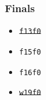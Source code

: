 \begin{minipage}[t]{\width\textwidth}
    \subsubsection*{Finals}
    \begin{itemize}
        \item \st{\texttt{f13f0}}
        \item \texttt{f15f0}
        \item \texttt{f16f0}
        \item \st{\texttt{w19f0}}
    \end{itemize}
\end{minipage}